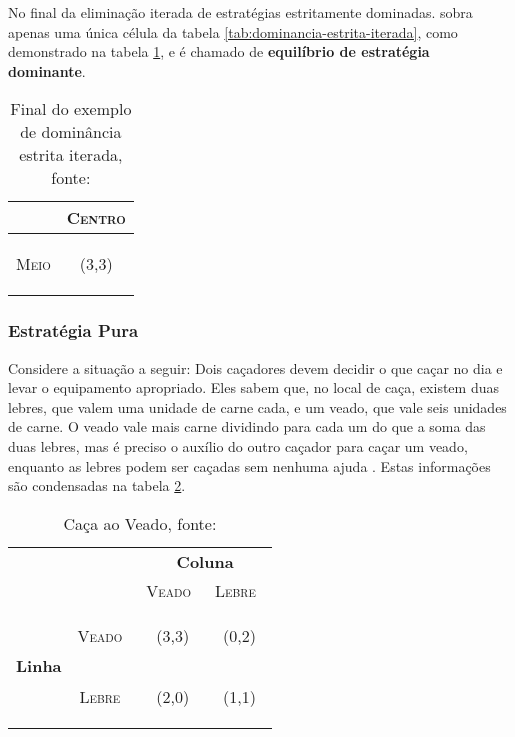 No final da eliminação iterada de estratégias estritamente dominadas. sobra apenas uma única célula da tabela \ref{tab:dominancia-estrita-iterada}, como demonstrado na tabela \ref{tab:final-dominancia-estrita-iterada}, e é chamado de \textbf{equilíbrio de estratégia dominante}.

\begin{table}[ht]
\centering
\begin{tabular}{|c|c|}
\cline{2-2}
\multicolumn{1}{c|}{} & {\scshape Centro} \tabularnewline
\hline
\begin{turn}{90}
{\scshape Meio}
\end{turn} &  {\Large(}{\Large 3,}{\Large 3)}\tabularnewline
\hline
\end{tabular}
\caption{Final do exemplo de dominância estrita iterada, fonte: \cite{spaniel_2011}}
\label{tab:final-dominancia-estrita-iterada}
\end{table}

\subsubsection{Estratégia Pura}

Considere a situação a seguir: Dois caçadores devem decidir o que caçar no dia e levar o equipamento apropriado. Eles sabem que, no local de caça, existem duas lebres, que valem uma unidade de carne cada, e um veado, que vale seis unidades de carne. O veado vale mais carne dividindo para cada um do que a soma das duas lebres, mas é preciso o auxílio do outro caçador para caçar um veado, enquanto as lebres podem ser caçadas sem nenhuma ajuda \cite{spaniel_2011}. Estas informações são condensadas na tabela \ref{tab:caca-ao-viado}.

\begin{table}[ht]
\centering
\begin{tabular}{|c|c|c|c|}
	\cline{3-4}
	\multicolumn{1}{c}{} &  & \multicolumn{2}{c|}{{\bfseries Coluna}}\tabularnewline
	\cline{3-4}
	\multicolumn{1}{c}{} &  & {\scshape Veado}\  & {\scshape Lebre}\ \tabularnewline
	\hline
	\multirow{2}{*}{\begin{turn}{90}
	{\bfseries Linha}
	\end{turn}} & \begin{turn}{90}
	{\scshape Veado}\
	\end{turn} & {\Large(3,3)} & {\Large(0,2)}\tabularnewline
	\cline{2-4}
	 & \begin{turn}{90}
	{\scshape Lebre}\
	\end{turn} & {\Large(2,0)} & {\Large(1,1)}\tabularnewline
	\hline
\end{tabular}
\caption{Caça ao Veado, fonte: \cite{spaniel_2011}}
\label{tab:caca-ao-viado}
\end{table}




